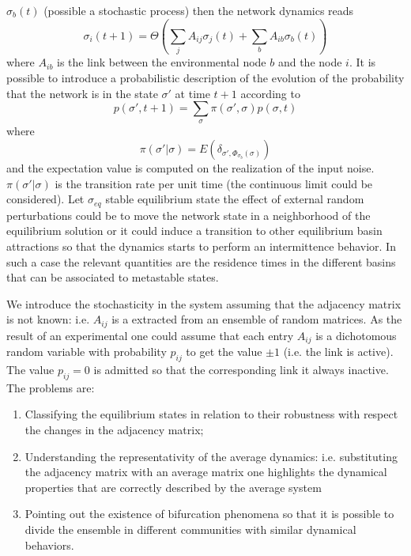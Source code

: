 $\sigma_b(t)$ (possible a stochastic process) then the network dynamics reads
$$
\sigma_i(t+1)=\Theta\left (\sum_j A_{ij}\sigma_j(t)+\sum_b A_{ib}\sigma_b(t)\right )
$$
where $A_{ib}$ is the link between the environmental node $b$ and the node $i$. It is possible to introduce a probabilistic description of the evolution
of the probability that the network is in the state $\sigma'$ at time $t+1$ according to
\begin{equation}
p(\sigma',t+1)=\sum_{\sigma}\pi(\sigma',\sigma)p(\sigma,t)
\label{lapla}
\end{equation}
where
$$
\pi(\sigma'|\sigma)=E\left (\delta_{\sigma',\Phi_{\sigma_b}(\sigma)} \right )
$$
and the expectation value is computed on the realization of the input noise. $\pi(\sigma'|\sigma)$ is the transition rate per unit time (the continuous limit could be considered).
Let $\sigma_{eq}$ stable equilibrium state the effect of external random perturbations could be to move the network state in a neighborhood of the equilibrium solution
or it could induce a transition to other equilibrium basin attractions so that the dynamics starts to perform an intermittence behavior. In such a case the relevant quantities are  
the residence times in the different basins that can be associated to metastable states.
\par\noindent
We introduce the stochasticity in the system assuming that the adjacency matrix is not known: i.e. $A_{ij}$ is a extracted from an ensemble of random matrices.
As the result of an experimental one could assume that each entry $A_{ij}$ is a dichotomous random variable with probability $p_{ij}$ to get the value $\pm 1$ (i.e. the
link is active). The value $p_{ij}=0$ is admitted so that the corresponding link it always inactive. The problems are:
\begin{enumerate}
    	\item Classifying the equilibrium states in relation to their robustness with respect the changes in the adjacency matrix;
     \item Understanding the representativity of the average dynamics: i.e. substituting the adjacency matrix with an average matrix one highlights the dynamical properties 
     that are correctly described by the average system
     \item Pointing out the existence of bifurcation phenomena so that it is possible to divide the ensemble in different communities with similar dynamical behaviors.
\end{enumerate}

